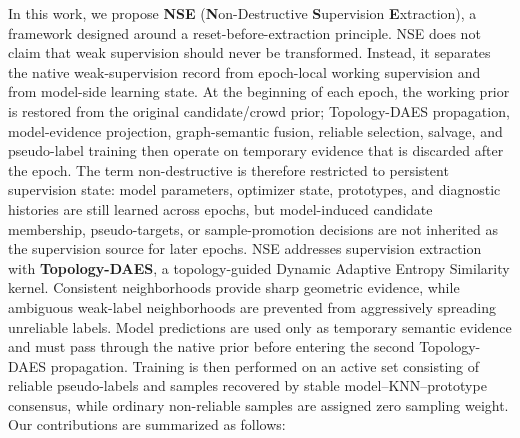 In this work, we propose \textbf{NSE} (\textbf{N}on-Destructive \textbf{S}upervision \textbf{E}xtraction), a framework designed around a reset-before-extraction principle. NSE does not claim that weak supervision should never be transformed. Instead, it separates the native weak-supervision record from epoch-local working supervision and from model-side learning state. At the beginning of each epoch, the working prior is restored from the original candidate/crowd prior; Topology-DAES propagation, model-evidence projection, graph-semantic fusion, reliable selection, salvage, and pseudo-label training then operate on temporary evidence that is discarded after the epoch. The term non-destructive is therefore restricted to persistent supervision state: model parameters, optimizer state, prototypes, and diagnostic histories are still learned across epochs, but model-induced candidate membership, pseudo-targets, or sample-promotion decisions are not inherited as the supervision source for later epochs. NSE addresses supervision extraction with \textbf{Topology-DAES}, a topology-guided Dynamic Adaptive Entropy Similarity kernel. Consistent neighborhoods provide sharp geometric evidence, while ambiguous weak-label neighborhoods are prevented from aggressively spreading unreliable labels. Model predictions are used only as temporary semantic evidence and must pass through the native prior before entering the second Topology-DAES propagation. Training is then performed on an active set consisting of reliable pseudo-labels and samples recovered by stable model--KNN--prototype consensus, while ordinary non-reliable samples are assigned zero sampling weight. Our contributions are summarized as follows:


